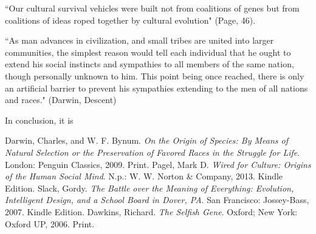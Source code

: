 \documentclass[11pt, oneside]{article}
\begin{document}
``Our cultural survival vehicles were built not from coalitions of genes but from coalitions of ideas roped together by cultural evolution" (Page, 46).

``As man advances in civilization, and small tribes are united into larger communities, the simplest reason would tell each individual that he ought to extend his social instincts and sympathies to all members of the same nation, though personally unknown to him. This point being once reached, there is only an artificial barrier to prevent his sympathies extending to the men of all nations and races." (Darwin, Descent)

\par In conclusion, it is 

\begin{thebibliography}{9}
	Darwin, Charles, and W. F. Bynum.
	\emph{On the Origin of Species: By Means of Natural Selection or the Preservation of Favored Races in the Struggle for Life}.
	London: Penguin Classics, 2009.
	Print.
	Pagel, Mark D. 
	\emph{Wired for Culture: Origins of the Human Social Mind}. 
	N.p.: W. W. Norton \& Company, 2013. 
	Kindle Edition. 
	Slack, Gordy. 
	\emph{The Battle over the Meaning of Everything: Evolution, Intelligent Design, and a School Board in Dover, PA}.
	San Francisco: Jossey-Bass, 2007. 
	Kindle Edition.
	Dawkins, Richard. 
	\emph{The Selfish Gene}.
	Oxford; New York: Oxford UP, 2006. 
	Print.
\end{thebibliography}
\end{document}
